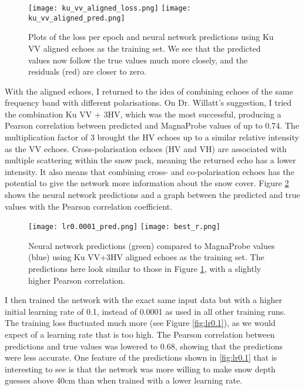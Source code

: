 \documentclass[11pt, a4paper]{article}
\begin{document}
\begin{figure}
\centering
   		 \texttt{[image: ku\_vv\_aligned\_loss.png]}
   		 \texttt{[image: ku\_vv\_aligned\_pred.png]}
    		\caption{Plots of the loss per epoch and neural network predictions using Ku VV aligned echoes as the training set.  We see that the predicted values now follow the true values much more closely, and the residuals (red) are closer to zero. }
	\label{fig:alpred}
\end{figure}

With the aligned echoes, I returned to the idea of combining echoes of the same frequency band with different polarisations.  On Dr.  Willatt's suggestion, I tried the combination Ku VV + 3HV, which was the most successful,  producing a Pearson correlation between predicted and MagnaProbe values of up to 0.74.  The multiplication factor of 3 brought the HV echoes up to a similar relative intensity as the VV echoes.  Cross-polarisation echoes (HV and VH) are associated with multiple scattering within the snow pack, meaning the returned echo has a lower intensity.  It also means that combining cross- and co-polarisation echoes has the potential to give the network more information about the snow cover.  Figure \ref{fig:kuvv3hv} shows the neural network predictions and a graph between the predicted and true values with the Pearson correlation coefficient.

\begin{figure}[H]
\centering
   		 \texttt{[image: lr0.0001\_pred.png]}
   		 \texttt{[image: best\_r.png]}
    		\caption{Neural network predictions (green) compared to MagnaProbe values (blue) using Ku VV+3HV aligned echoes as the training set.  The predictions here look similar to those in Figure \ref{fig:alpred}, with a slightly higher Pearson correlation.}
	\label{fig:kuvv3hv}
\end{figure}

I then trained the network with the exact same input data but with a higher initial learning rate of 0.1, instead of 0.0001 as used in all other training runs. The training loss fluctuated much more (see Figure \ref{fig:lr0.1}),  as we would expect of a learning rate that is too high. The Pearson correlation between predictions and true values was lowered to 0.68, showing that the predictions were less accurate.  One feature of the predictions shown in \ref{fig:lr0.1} that is interesting to see is that the network was more willing to make snow depth guesses above 40cm than when trained with a lower learning rate.
\end{document}
